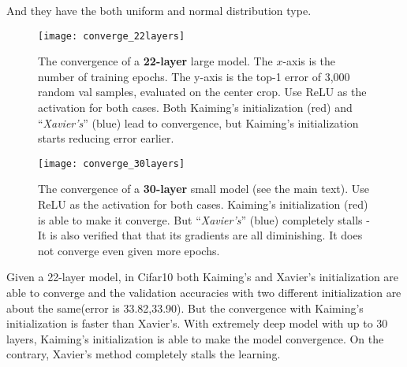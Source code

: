 And they have the both uniform and normal distribution type.
\begin{figure}[H]
	\begin{center}
		\texttt{[image: converge\_22layers]}
	\end{center}
	\caption{The convergence of a \textbf{22-layer} large model. The $x$-axis is the number of training epochs. The y-axis is the top-1 error of 3,000 random val samples, evaluated on the center crop. Use ReLU as the activation for both cases. Both Kaiming's initialization (red) and ``\emph{Xavier's}'' (blue) \cite{glorot2010understanding} lead to convergence, but Kaiming's initialization starts reducing error earlier.}
	\label{fig:converge_22layers}
\end{figure}
\begin{figure}[H]
	\begin{center}
		\texttt{[image: converge\_30layers]}
	\end{center}
	\caption{The convergence of a \textbf{30-layer} small model (see the main text). Use ReLU as the activation for both cases. Kaiming's initialization (red) is able to make it converge. But ``\emph{Xavier's}'' (blue) \cite{glorot2010understanding} completely stalls - It is also verified that that its gradients are all diminishing. It does not converge even given more epochs.}
	\label{fig:converge_30layers}
\end{figure}

Given a 22-layer model, in Cifar10 both Kaiming's and Xavier's initialization are able to converge and the validation accuracies with two different initialization 
are about the same(error is 33.82,33.90). But the convergence with Kaiming's initialization is faster than Xavier's.
With extremely deep model with up to 30 layers, 
Kaiming's initialization is able to make the model convergence. On the contrary, Xavier's method completely stalls the learning.


\endinput

\iffalse
\subsection{Basic assumptions in Xavier's and Kaiming's initialization.}
\begin{itemize}
	\item $f^\ell$ is a random vector and $f^\ell_i$ for $i = 1:n_\ell$ are i.i.d.
	\item $W^\ell$ should be initialized as random vector independently to $f^{\ell-1}$ and $W^\ell_{ij}$ 
	for all $i = 1:n_{\ell},j=1:n_{\ell-1}$ are i.i.d with a zero mean and symmetric distribution around zero.
	\item $b^\ell = 0$.
\end{itemize}


